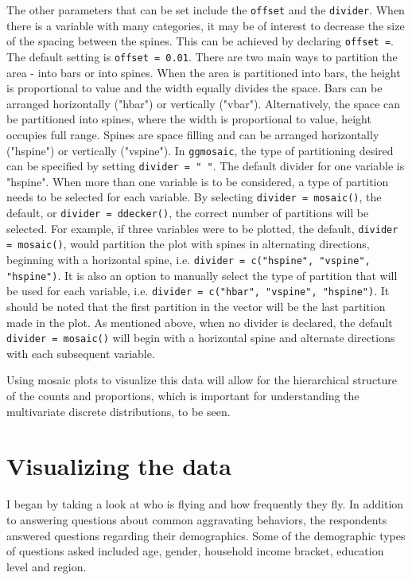 \documentclass[DIV=calc, paper=a4, fontsize=10pt, twocolumn]{scrartcl}	 %
\begin{document}
\par The other parameters that can be set include the \texttt{offset} and the \texttt{divider}. When there is a variable with many categories, it may be of interest to decrease the size of the spacing between the spines. This can be achieved by declaring \texttt{offset =}. The default setting is \texttt{offset = 0.01}. There are two main ways to partition the area - into bars or into spines. When the area is partitioned into bars, the height is proportional to value and the width equally divides the space. Bars can be arranged horizontally ("hbar") or vertically ("vbar"). Alternatively, the space can be partitioned into spines, where the width is proportional to value, height occupies full range. Spines are space filling and can be arranged horizontally ("hspine") or vertically ("vspine"). In \texttt{ggmosaic}, the type of partitioning desired can be specified by setting \texttt{divider = " "}. The default divider for one variable is "hspine".
When more than one variable is to be considered, a type of partition needs to be selected for each variable. By selecting \texttt{divider = mosaic()}, the default, or \texttt{divider = ddecker()}, the correct number of partitions will be selected. For example, if three variables were to be plotted, the default, \texttt{divider = mosaic()}, would partition the plot with spines in alternating directions, beginning with a horizontal spine, i.e. \texttt{divider = c("hspine", "vspine", "hspine")}. It is also an option to manually select the type of partition that will be used for each variable, i.e. \texttt{divider = c("hbar", "vspine", "hspine")}. It should be noted that the first partition in the vector will be the last partition made in the plot. As mentioned above, when no divider is declared, the default \texttt{divider = mosaic()} will begin with a horizontal spine and alternate directions with each subsequent variable.

\par Using mosaic plots to visualize this data will allow for the hierarchical structure of the counts and proportions, which is important for understanding the multivariate discrete distributions, to be seen.

\section*{Visualizing the data}

\par I began by taking a look at who is flying and how frequently they fly. In addition to answering questions about common aggravating behaviors, the respondents answered questions regarding their demographics. Some of the demographic types of questions asked included age, gender, household income bracket, education level and region.
\end{document}
